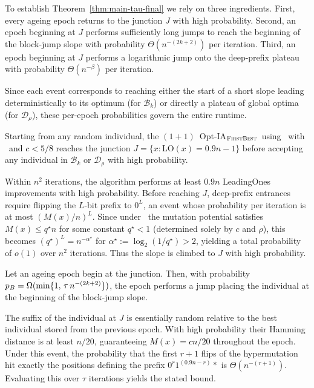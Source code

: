 To establish Theorem~\ref{thm:main-tau-final} we rely on three ingredients.
First, every ageing epoch returns to the junction $J$ with high probability.
Second, an epoch beginning at $J$ performs sufficiently long jumps to reach the beginning of the block-jump slope with probability $\Theta(n^{-(2k+2)})$ per iteration.
Third, an epoch beginning at $J$ performs a logarithmic jump onto the deep-prefix plateau with probability $\Theta(n^{-\beta})$ per iteration.

Since each event corresponds to reaching either the start of a short slope leading deterministically to its optimum (for $\mathcal{B}_k$) or directly a plateau of global optima (for $\mathcal{D}_\rho$), these per-epoch probabilities govern the entire runtime.

\begin{lemma} \label{lem:junction-first-density-Bk}
	Starting from any random individual, the $(1+1)$~Opt-IA$_{\textsc{FirstBest}}$~using \IPHfcm{}~with \linHD~\textcolor{black}{and $c<5/8$}  reaches the junction $J = \{x : \mathrm{LO}(x)=0.9n-1\}$ before accepting any individual in $\mathcal{B}_k$ or $\mathcal{D}_\rho$ with high probability.
\end{lemma}

Within $n^2$ iterations, the algorithm performs at least $0.9n$ LeadingOnes 
improvements with high probability.  
Before reaching $J$, deep-prefix entrances require flipping the $L$-bit prefix 
to $0^L$, an event whose probability per iteration is at most $(M(x)/n)^L$.  
Since under \linHD\ the mutation potential satisfies $M(x) \le q^\star n$ for 
some constant $q^\star < 1$ (determined solely by $c$ and $\rho$), this becomes 
$(q^\star)^L = n^{-\alpha^\star}$ for $\alpha^\star := \log_2(1/q^\star) > 2$, 
yielding a total probability of $o(1)$ over $n^2$ iterations.
Thus the slope is climbed to $J$ with high probability.

\begin{lemma} \label{lem:BJO-epoch}
	Let an ageing epoch begin at the junction.
	Then, with probability $\textcolor{black}{p_B}=\Omega(\min\{1,\,\tau\,n^{-(2k+2)}\})$, the epoch performs a jump placing the individual at the beginning of the block-jump slope.
\end{lemma}

The suffix of the individual at $J$ is essentially random relative to the best individual stored from the 
previous epoch. 
With high probability their Hamming distance is at least $n/20$, guaranteeing 
\textcolor{black}{$M(x)= cn/20$} throughout the epoch.  
Under this event, the probability that the first $r+1$ flips of the hypermutation hit exactly the positions defining the prefix $0^{r}1^{(0.9n-r)} *$ is $\Theta(n^{-(r+1)})$.
Evaluating this over $\tau$ iterations yields the stated bound.

